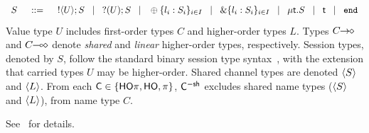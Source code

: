 \documentclass[runningheads]{llncs}
\begin{document}
{\[\begin{array}{rcl}
		S & \;\;::=\;\; &	! \langle U \rangle ; S \;\;\;|\;\;\; ? (U) ; S \;\;\;|\;\;\; \oplus \{l_i:S_i\}_{i \in I}
						\;\;\;|\;\;\; \& \{l_i:S_i\}_{i \in I} \;\;\;|\;\;\;  \mu\mathsf{t}.S \;\;\;|\;\;\; \mathsf{t}  \;\;\;|\;\;\; \mathtt{end}
	\end{array}
\]
Value type $U$ includes
  first-order types $C$ and  higher-order
types $L$.
Types $C\!\! \rightarrow\!\! \diamond$ and $C\!\! \multimap\!\! \diamond$ denote
{\em shared} and {\em linear} higher-order 
types, respectively.
Session types, denoted by $S$, follow the standard binary session type syntax~\cite{honda.vasconcelos.kubo:language-primitives}, with
the extension that carried types $U$ may be higher-order.
Shared channel types are denoted $\langle S \rangle$ and $\langle L \rangle$.
From each $\mathsf{C} \in \{\mathsf{HO}\pi, \mathsf{HO}, \pi \}$, $\mathsf{C}^{-\mathsf{sh}}$ 
excludes shared name types ($\langle S \rangle$ and $\langle L \rangle$), 
from name type $C$.

See~ for details.


}
\end{document}
